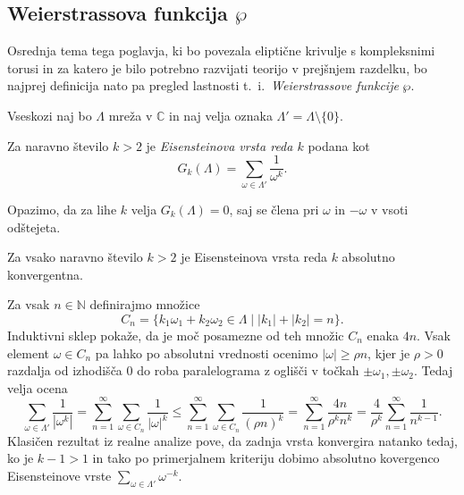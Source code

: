 \documentclass[mat1]{fmfdelo}
\numberwithin{equation}{section}
\newcommand{\N}{\mathbb N}
\newcommand{\C}{\mathbb C}
\newcommand{\om}{\omega}
\newcommand{\abs}[1]{\left\lvert #1 \right\rvert}
\newcommand{\ti}{t.~i.\ }
\theoremstyle{definition}
\begin{document}

\subsection{Weierstrassova funkcija $\wp$}

Osrednja tema tega poglavja, ki bo povezala eliptične krivulje s kompleksnimi torusi in za katero je bilo potrebno razvijati teorijo v prejšnjem razdelku, bo najprej definicija nato pa pregled lastnosti \ti \emph{Weierstrassove funkcije} $\wp$. 

Vseskozi naj bo $\Lambda$ mreža v $\C$ in naj velja oznaka $\Lambda' = \Lambda \setminus \{0\}$.

\begin{definicija}
    \label{eisensteinova vrsta}
    Za naravno število $k > 2$ je \emph{Eisensteinova vrsta reda $k$} podana kot
    \[
        G_k(\Lambda) = \sum_{\om \in \Lambda'} \frac{1}{\om^k}.  
    \]
\end{definicija}

\begin{opomba}
    Opazimo, da za lihe $k$ velja $G_k(\Lambda) = 0$, saj se člena pri $\om$ in $-\om$ v vsoti odštejeta. 
\end{opomba}

\begin{lema}
    \label{lema o konvergenci eisensteinove vrste}
    Za vsako naravno število $k > 2$ je Eisensteinova vrsta reda $k$ absolutno konvergentna.
\end{lema}

\begin{dokaz}
    Za vsak $n \in \N$ definirajmo množice
    \[
        C_n = \{k_1 \om_1 + k_2 \om_2\in \Lambda \mid \abs{k_1} + \abs{k_2} = n\}.  
    \]
    Induktivni sklep pokaže, da je moč posamezne od teh množic $C_n$ enaka $4n$.
    Vsak element $\om \in C_n$ pa lahko po absolutni vrednosti ocenimo $\left\lvert \om \right\rvert \geq \rho n$, kjer je $\rho > 0$ razdalja od izhodišča $0$ do roba paralelograma z oglišči v točkah $\pm \om_1, \pm \om_2$. Tedaj velja ocena
    \[
        \sum_{\om \in \Lambda'} \frac{1}{\left\lvert  \om^k \right\rvert} = 
        \sum_{n = 1}^\infty \sum_{\om \in C_n} \frac{1}{\left\lvert  \om \right\rvert^k} \leq
        \sum_{n = 1}^\infty \sum_{\om \in C_n} \frac{1}{(\rho n)^k} =
        \sum_{n = 1}^\infty \frac{4n}{\rho^k n^k} = 
        \frac{4}{\rho^k} \sum_{n = 1}^\infty \frac{1}{n^{k-1}}.
    \]
    Klasičen rezultat iz realne analize pove, da zadnja vrsta konvergira natanko tedaj, ko je $k - 1 > 1$ in tako po primerjalnem kriteriju dobimo absolutno kovergenco Eisensteinove vrste $\sum_{\om \in \Lambda'} \om^{-k}$.
\end{dokaz}
\end{document}
